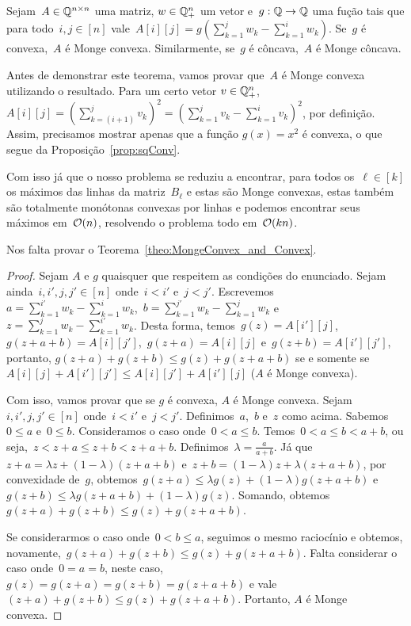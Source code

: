\begin{theo} \label{theo:MongeConvex_and_Convex}
Sejam~$A \in \mathbb{Q}^{n \times n}$ uma matriz, $w \in \mathbb{Q}_+^n$ um vetor e~${g : \mathbb{Q} \to \mathbb{Q}}$ uma fução tais que para todo~$i,j \in [n]$ vale~${A[i][j] = g\left(\sum\limits_{k=1}^j w_k - \sum\limits_{k=1}^i w_k\right)}$. Se~$g$ é convexa,~$A$ é Monge convexa. Similarmente, se~$g$ é côncava,~$A$ é Monge côncava.
\end{theo}

Antes de demonstrar este teorema, vamos provar que~$A$ é Monge convexa utilizando o resultado. Para um certo vetor $v \in \mathbb{Q}_+^n$, $A[i][j] = \left(\sum\limits_{k=(i+1)}^{j} v_k \right)^2 = \left(\sum\limits_{k=1}^{j} v_k - \sum\limits_{k=1}^{i} v_k \right)^2$, por definição. Assim, precisamos mostrar apenas que a função $g(x) = x^2$ é convexa, o que segue da Proposição~\ref{prop:sqConv}.

Com isso já que o nosso problema se reduziu a encontrar, para todos os~$\ell \in [k]$ os máximos das linhas da matriz~$B_\ell$ e estas são Monge convexas, estas também são totalmente monótonas convexas por linhas e podemos encontrar seus máximos em~$\mathcal{O}(n)$, resolvendo o problema todo em~$\mathcal{O}(kn)$.

Nos falta provar o Teorema~\ref{theo:MongeConvex_and_Convex}.

\begin{proof}
Sejam $A$ e $g$ quaisquer que respeitem as condições do enunciado. Sejam ainda~$i,i',j,j' \in [n]$ onde~$i < i'$ e~$j < j'$. Escrevemos~$a = \sum \limits_{k=1}^{i'} w_k - \sum \limits_{k=1}^{i} w_k$,~$b = \sum \limits_{k=1}^{j'} w_k - \sum \limits_{k=1}^{j} w_k$ e~$z = \sum \limits_{k=1}^{j} w_k - \sum \limits_{k=1}^{i'} w_k$. Desta forma, temos~$g(z) = A[i'][j]$,~$g(z+a+b) = A[i][j']$,~$g(z+a) = A[i][j]$ e~$g(z+b) = A[i'][j']$, portanto, $g(z+a) + g(z+b) \leq g(z) + g(z+a+b)$ se e somente se $A[i][j] + A[i'][j'] \leq A[i][j'] + A[i'][j]$ ($A$ é Monge convexa).

Com isso, vamos provar que se $g$ é convexa, $A$ é Monge convexa. Sejam~$i,i',j,j' \in [n]$ onde~$i < i'$ e~$j < j'$. Definimos~$a$,~$b$ e~$z$ como acima. Sabemos~$0 \leq a$ e~$0 \leq b$. Consideramos o caso onde~$0 < a \leq b$. Temos~$0 < a \leq b < a+b$, ou seja,~$z < z+a \leq z+b < z+a+b$. Definimos~$\lambda = \frac{a}{a+b}$. Já que~$z+a = \lambda z + (1-\lambda)(z+a+b)$ e~$z+b = (1-\lambda)z + \lambda(z+a+b)$, por convexidade de~$g$, obtemos~$g(z+a) \leq \lambda g(z) + (1 - \lambda) g(z+a+b)$ e~$g(z+b) \leq \lambda g(z+a+b) + (1 - \lambda) g(z)$. Somando, obtemos~$g(z+a) + g(z+b) \leq g(z) + g(z+a+b)$.  

Se considerarmos o caso onde~$0 < b \leq a$, seguimos o mesmo raciocínio e obtemos, novamente,~$g(z+a) + g(z+b) \leq g(z) + g(z+a+b)$. Falta considerar o caso onde~$0 = a = b$, neste caso,~$g(z) = g(z+a) = g(z+b) = g(z+a+b)$ e vale~$(z+a) + g(z+b) \leq g(z) + g(z+a+b)$. Portanto, $A$ é Monge convexa.
\end{proof}

